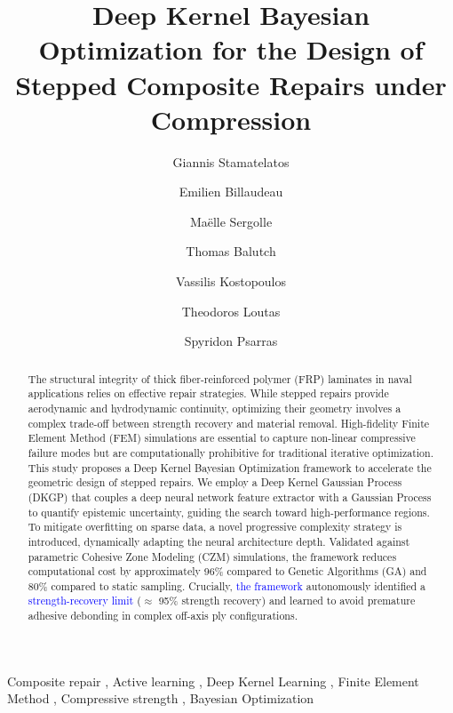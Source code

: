 \documentclass[
  preprint,
  12pt,
  a4paper
]{elsarticle}
\newcommand{\new}[1]{\textcolor{blue}{#1}}
\begin{document}
\begin{frontmatter}

\title{Deep Kernel Bayesian Optimization for the Design of Stepped Composite Repairs under Compression}


\author[1]{Giannis Stamatelatos}

\author[2]{Emilien Billaudeau}
\author[2]{Maëlle Sergolle}
\author[2]{Thomas Balutch}
\author[1]{Vassilis Kostopoulos}
\author[1]{Theodoros Loutas}
\author[1]{Spyridon Psarras}

\address[1]{Applied Mechanics Laboratory (AML), Department of Mechanical Engineering \& Aeronautics, University of Patras, Patras, Greece}
\address[2]{Naval Group, Centre d'Expertise des Structures et Matériaux Navals, Technocampus Océan, 5 rue de l'Halbran, 4434, France}


\begin{abstract}
The structural integrity of thick fiber-reinforced polymer (FRP) laminates in naval applications relies on effective repair strategies. While stepped repairs provide aerodynamic and hydrodynamic continuity, optimizing their geometry involves a complex trade-off between strength recovery and material removal. High-fidelity Finite Element Method (FEM) simulations are essential to capture non-linear compressive failure modes but are computationally prohibitive for traditional iterative optimization. This study proposes a Deep Kernel Bayesian Optimization framework to accelerate the geometric design of stepped repairs. We employ a Deep Kernel Gaussian Process (DKGP) that couples a deep neural network feature extractor with a Gaussian Process to quantify epistemic uncertainty, guiding the search toward high-performance regions. To mitigate overfitting on sparse data, a novel progressive complexity strategy is introduced, dynamically adapting the neural architecture depth. Validated against parametric Cohesive Zone Modeling (CZM) simulations, the framework reduces computational cost by approximately 96\% compared to Genetic Algorithms (GA) and 80\% compared to static sampling. Crucially, \new{the framework} autonomously identified a \new{strength-recovery limit} ($\approx$ 95\% strength recovery) and learned to avoid premature adhesive debonding in complex off-axis ply configurations.
\end{abstract}

\begin{keyword}
Composite repair \sep 
Active learning \sep 
Deep Kernel Learning \sep 
Finite Element Method \sep 
Compressive strength \sep 
Bayesian Optimization
\end{keyword}

\end{frontmatter}
\end{document}
